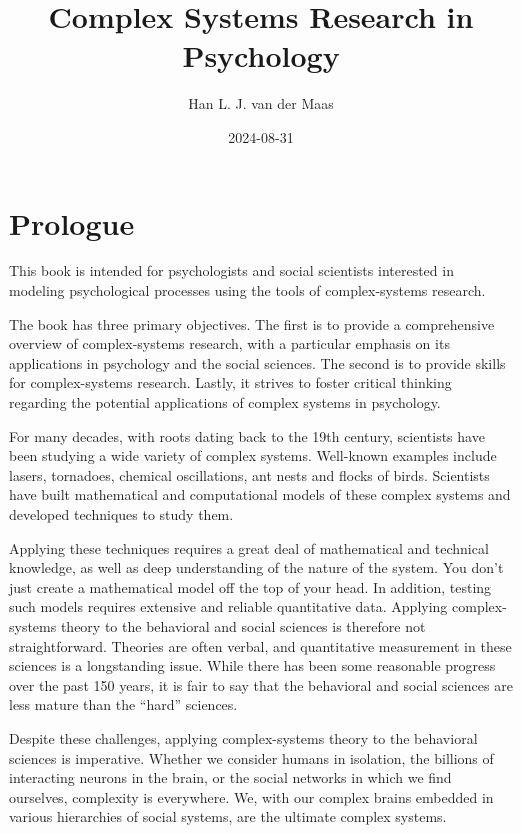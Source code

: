 \documentclass[
  a4paper,
  DIV=11,
  numbers=noendperiod,
  oneside]{scrreprt}
\title{Complex Systems Research in Psychology}
\author{Han L. J. van der Maas}
\date{2024-08-31}
\renewcommand*\contentsname{Table of contents}
\newcommand\contentsname{Table of contents}
\begin{document}
\maketitle

\renewcommand*\contentsname{Table of contents}
{
\hypersetup{linkcolor=}
\setcounter{tocdepth}{7}
\tableofcontents
}

\chapter*{Prologue}\label{prologue}


This book is intended for psychologists and social scientists interested
in modeling psychological processes using the tools of complex-systems
research.

The book has three primary objectives. The first is to provide a
comprehensive overview of complex-systems research, with a particular
emphasis on its applications in psychology and the social sciences. The
second is to provide skills for complex-systems research. Lastly, it
strives to foster critical thinking regarding the potential applications
of complex systems in psychology.

For many decades, with roots dating back to the 19th century, scientists
have been studying a wide variety of complex systems. Well-known
examples include lasers, tornadoes, chemical oscillations, ant nests and
flocks of birds. Scientists have built mathematical and computational
models of these complex systems and developed techniques to study them.

Applying these techniques requires a great deal of mathematical and
technical knowledge, as well as deep understanding of the nature of the
system. You don't just create a mathematical model off the top of your
head. In addition, testing such models requires extensive and reliable
quantitative data. Applying complex-systems theory to the behavioral and
social sciences is therefore not straightforward. Theories are often
verbal, and quantitative measurement in these sciences is a longstanding
issue. While there has been some reasonable progress over the past 150
years, it is fair to say that the behavioral and social sciences are
less mature than the ``hard'' sciences.

Despite these challenges, applying complex-systems theory to the
behavioral sciences is imperative. Whether we consider humans in
isolation, the billions of interacting neurons in the brain, or the
social networks in which we find ourselves, complexity is everywhere.
We, with our complex brains embedded in various hierarchies of social
systems, are the ultimate complex systems.
\end{document}
